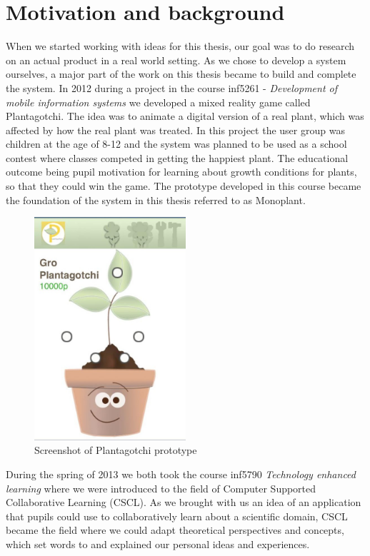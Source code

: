 \section{Motivation and background}
When we started working with ideas for this thesis, our goal was to do research on an actual product in a real world setting. As we chose to develop a system ourselves, a major part of the work on this thesis became to build and complete the system. In 2012 during a project in the course inf5261 - \emph{Development of mobile information systems} we developed a mixed reality game called Plantagotchi. The idea was to animate a digital version of a real plant, which was affected by how the real plant was treated. In this project the user group was children at the age of 8-12 and the system was planned to be used as a school contest where classes competed in getting the happiest plant. The educational outcome being pupil motivation for learning about growth conditions for plants, so that they could win the game. The prototype developed in this course became the foundation of the system in this thesis referred to as Monoplant.

\begin{figure}
\centering
\includegraphics[width=0.5\textwidth]{img/introduction/plantagotchi.jpg}
\caption{Screenshot of Plantagotchi prototype}
\label{fig:scrshotplantagotchi}
\end{figure}

During the spring of 2013 we both took the course inf5790 \emph{Technology enhanced learning} where we were introduced to the field of Computer Supported Collaborative Learning (CSCL). As we brought with us an idea of an application that pupils could use to collaboratively learn about a scientific domain, CSCL became the field where we could adapt theoretical perspectives and concepts, which set words to and explained our personal ideas and experiences. 

